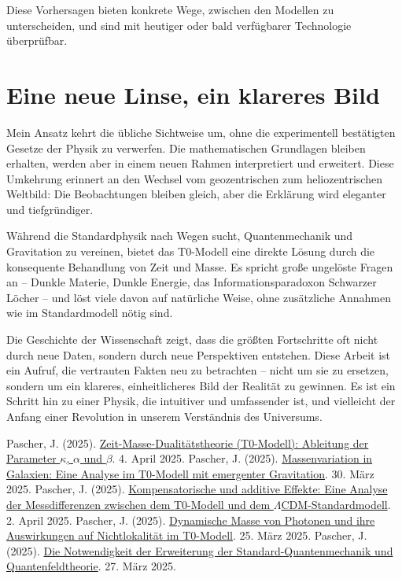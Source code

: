 \documentclass[a4paper,12pt]{article}
\begin{document}
	Diese Vorhersagen bieten konkrete Wege, zwischen den Modellen zu unterscheiden, und sind mit heutiger oder bald verfügbarer Technologie überprüfbar.
	
	\section{Eine neue Linse, ein klareres Bild}
	
	Mein Ansatz kehrt die übliche Sichtweise um, ohne die experimentell bestätigten Gesetze der Physik zu verwerfen. Die mathematischen Grundlagen bleiben erhalten, werden aber in einem neuen Rahmen interpretiert und erweitert. Diese Umkehrung erinnert an den Wechsel vom geozentrischen zum heliozentrischen Weltbild: Die Beobachtungen bleiben gleich, aber die Erklärung wird eleganter und tiefgründiger.
	
	Während die Standardphysik nach Wegen sucht, Quantenmechanik und Gravitation zu vereinen, bietet das T0-Modell eine direkte Lösung durch die konsequente Behandlung von Zeit und Masse. Es spricht große ungelöste Fragen an – Dunkle Materie, Dunkle Energie, das Informationsparadoxon Schwarzer Löcher – und löst viele davon auf natürliche Weise, ohne zusätzliche Annahmen wie im Standardmodell nötig sind.
	
	Die Geschichte der Wissenschaft zeigt, dass die größten Fortschritte oft nicht durch neue Daten, sondern durch neue Perspektiven entstehen. Diese Arbeit ist ein Aufruf, die vertrauten Fakten neu zu betrachten – nicht um sie zu ersetzen, sondern um ein klareres, einheitlicheres Bild der Realität zu gewinnen. Es ist ein Schritt hin zu einer Physik, die intuitiver und umfassender ist, und vielleicht der Anfang einer Revolution in unserem Verständnis des Universums.
	
	\begin{thebibliography}{99}
		 Pascher, J. (2025). \href{https://github.com/jpascher/T0-Time-Mass-Duality/tree/main/2/pdf/Deutsch/ZeitMasseT0Params.pdf}{Zeit-Masse-Dualitätstheorie (T0-Modell): Ableitung der Parameter \(\kappa\), \(\alpha\) und \(\beta\)}. 4. April 2025.
		 Pascher, J. (2025). \href{https://github.com/jpascher/T0-Time-Mass-Duality/tree/main/2/pdf/Deutsch/MassVarGalaxien.pdf}{Massenvariation in Galaxien: Eine Analyse im T0-Modell mit emergenter Gravitation}. 30. März 2025.
		 Pascher, J. (2025). \href{https://github.com/jpascher/T0-Time-Mass-Duality/tree/main/2/pdf/Deutsch/MessdifferenzenT0Standard.pdf}{Kompensatorische und additive Effekte: Eine Analyse der Messdifferenzen zwischen dem T0-Modell und dem \(\Lambda\)CDM-Standardmodell}. 2. April 2025.
		 Pascher, J. (2025). \href{https://github.com/jpascher/T0-Time-Mass-Duality/tree/main/2/pdf/Deutsch/DynMassePhotonenNichtlokal.pdf}{Dynamische Masse von Photonen und ihre Auswirkungen auf Nichtlokalität im T0-Modell}. 25. März 2025.
		 Pascher, J. (2025). \href{https://github.com/jpascher/T0-Time-Mass-Duality/tree/main/2/pdf/Deutsch/NotwendigkeitQMErweiterung.pdf}{Die Notwendigkeit der Erweiterung der Standard-Quantenmechanik und Quantenfeldtheorie}. 27. März 2025.
	\end{thebibliography}
	
\end{document}
